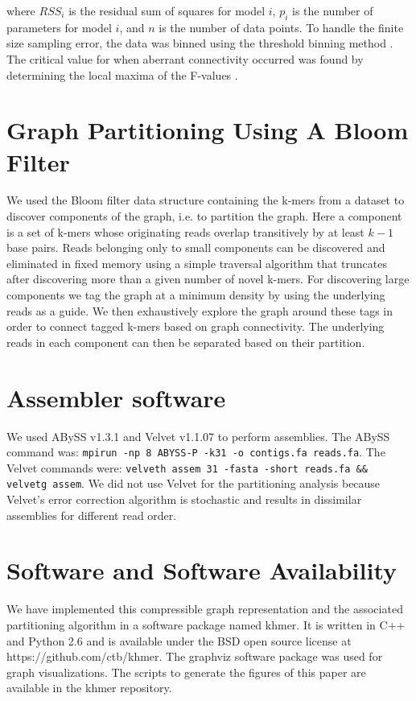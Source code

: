 \documentclass[draft]{pnastwo}
\begin{document}
\begin{article}
\begin{materials}
where $RSS_i$ is the residual sum of squares for model $i$, $p_i$ is
the number of parameters for model $i$, and $n$ is the number of data
points. To handle the finite size sampling error, the data was binned
using the threshold binning method \cite{adami2002critical}. The
critical value for when aberrant connectivity occurred was found by
determining the local maxima of the F-values \cite{wald43}.

\section{Graph Partitioning Using A Bloom Filter}

We used the Bloom filter data structure containing the k-mers from a
dataset to discover components of the graph, i.e. to partition the
graph.  Here a component is a set of k-mers whose originating reads
overlap transitively by at least $k-1$ base pairs.  Reads belonging
only to small components can be discovered and eliminated in fixed
memory using a simple traversal algorithm that truncates after
discovering more than a given number of novel k-mers.  For discovering
large components we tag the graph at a minimum density by using the
underlying reads as a guide.  We then exhaustively explore the graph
around these tags in order to connect tagged k-mers based on graph
connectivity.  The underlying reads in each component can then be
separated based on their partition.

\section{Assembler software}

We used ABySS v1.3.1 and Velvet v1.1.07 to perform assemblies.  The
ABySS command was: {\tt mpirun -np 8 ABYSS-P -k31 -o contigs.fa
  reads.fa}.  The Velvet commands were: {\tt velveth assem 31 -fasta
  -short reads.fa \&\& velvetg assem}.  We did not use Velvet for the
partitioning analysis because Velvet's error correction algorithm is
stochastic and results in dissimilar assemblies for different read
order.

\section{Software and Software Availability}

We have implemented this compressible graph representation and the
associated partitioning algorithm in a software package named khmer.
It is written in C++ and Python 2.6 and is available under the BSD
open source license at https://github.com/ctb/khmer.  The graphviz
software package was used for graph visualizations. The scripts to
generate the figures of this paper are available in the khmer
repository.


\end{materials}
\end{article}
\end{document}
